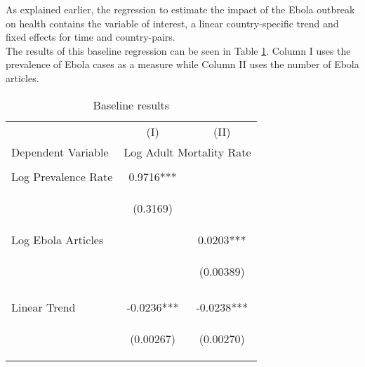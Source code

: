 \documentclass{article}
\begin{document}
As explained earlier, the regression to estimate the impact of the Ebola outbreak on health contains the variable of interest, a linear country-specific trend and fixed effects for time and country-pairs.\\
The results of this baseline regression can be seen in Table \ref{Baseline results}. Column I uses the prevalence of Ebola cases as a measure while Column II uses the number of Ebola articles.

\begin{center}
\begin{table}[htbp]\centering  \caption{Baseline results \label{Baseline results}}
\begin{tabular}{lcc} \hline
 & (I) & (II) \\
Dependent Variable & \multicolumn{2}{c}{Log Adult Mortality Rate} \\ \hline
\vspace{4pt} & \begin{footnotesize}\end{footnotesize} & \begin{footnotesize}\end{footnotesize} \\
Log Prevalence Rate & 0.9716*** &  \\
\vspace{4pt} & \begin{footnotesize}(0.3169)\end{footnotesize} & \begin{footnotesize}\end{footnotesize} \\
Log Ebola Articles &  & 0.0203*** \\
 & \begin{footnotesize}\end{footnotesize} & \begin{footnotesize}(0.00389)\end{footnotesize} \\
\vspace{4pt} & \begin{footnotesize}\end{footnotesize} & \begin{footnotesize}\end{footnotesize} \\
Linear Trend & -0.0236*** & -0.0238*** \\
\vspace{4pt} & \begin{footnotesize}(0.00267)\end{footnotesize} & \begin{footnotesize}(0.00270)\end{footnotesize} \\

\end{tabular}
\end{table}
\end{center}
\end{document}
